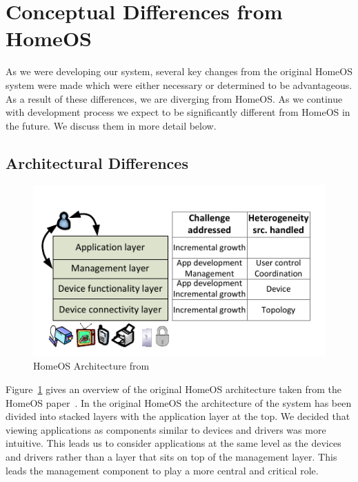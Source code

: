 \section{Conceptual Differences from HomeOS}                                                           
\label{sec:homeosdiff}
As we were developing our system, several key changes from the original HomeOS
system were made which were either necessary or determined to be advantageous.
As a result of these differences, we are diverging from HomeOS. As we continue
with development process we expect to be significantly different from HomeOS in
the future.  We discuss them in more detail below.
\subsection{Architectural Differences}
\label{sec:archdiff} 
\begin{figure}[tbh]                                                              
    \centering                                                                   
    \includegraphics[width=1.0\columnwidth]{figs/homeosOrig.png}                     
    \caption{HomeOS Architecture from~\cite{homeOS}}                                 
    \label{Fig:homeosarch}                                                           
\end{figure}                                                                     
Figure~\ref{Fig:homeosarch} gives an overview of the original HomeOS
architecture taken from the HomeOS paper~\cite{homeOS}.
In the original HomeOS the architecture of the system has been divided into 
stacked layers with the application layer at the top. We decided that viewing
applications as components similar to devices and drivers was more intuitive.
This leads us to consider applications at the same level as the devices and
drivers rather than a layer that sits on top of the management layer. This leads
the management component to play a more central and critical role.


